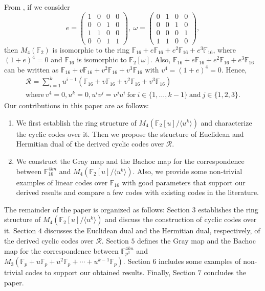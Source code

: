 \documentclass{amsart}
\theoremstyle{definition}
\theoremstyle{remark}
\numberwithin{equation}{section}
\begin{document}
    From \cite{F}, if we consider
    $$e=\begin{pmatrix}
    1&0&0&0\\
    0&0&1&0\\
    1&1&0&0\\
    0&0&1&1
    \end{pmatrix} , ~ \omega=\begin{pmatrix}
    0&1&0&0\\
    0&0&1&0\\
    0&0&0&1\\
    1&1&0&0
    \end{pmatrix},$$
    then $M_4( \mathbb F_2) $ is isomorphic to the ring $\mathbb F_{16}+e \mathbb F_{16}+e^2  \mathbb F_{16}+e^3 \mathbb F_{16}$, where  $(1 + e)^ 4 = 0$ and $\mathbb F_ {16}$ is isomorphic to $\mathbb F _2 [\omega]$. Also,
    $\mathbb F_{16}+e \mathbb F_{16}+e^2  \mathbb F_{16}+e^3 \mathbb F_{16}$ can be written as $\mathbb F_{16}+v \mathbb F_{16}+v^2  \mathbb F_{16}+v^3 \mathbb F_{16}$ with $v^ 4 = (1 + e)^ 4 = 0$. Hence,
    \begin{gather} \label{eq1}
    \mathcal{R} = \sum_{i=1}^{k}u^{i-1}( \mathbb F_{16}+ v\mathbb F_{16} + v^2\mathbb F_{16} + v^3\mathbb F_{16}) \nonumber \\   \text{where}~ v^4=0, u^k=0, u^iv^j=v^ju^i~ \text{for}~ i \in \{1,\dots, k-1\} ~\text{and}~ j \in \{1, 2, 3\}.
    \end{gather}
    Our contributions in this paper are as follows: 
    \begin{enumerate}
\item  We first establish the ring structure of $M_4 (\mathbb F_2 [u]/ \langle u^k \rangle)$ and characterize the cyclic codes over it. Then  we propose the structure of Euclidean and Hermitian dual of the derived cyclic codes over $\mathcal{R}$.
\item  We construct the Gray map and the Bachoc map for the correspondence between  $\mathbb F_{16}^{4kn}$ and $M_4 (\mathbb F_2 [u]/ \langle u^k \rangle)$. Also, we provide some non-trivial examples of linear codes over $\mathbb F_{16}$ with good parameters that support our derived results and compare a few codes with existing codes in the literature.
\end{enumerate}
{The remainder of the  paper is organized as follows: Section $3$ establishes the ring structure of $M_4 (\mathbb F_2 [u]/ \langle u^k \rangle)$ and discuss the construction of cyclic codes over it. Section $4$ discusses the Euclidean dual and the Hermitian dual, respectively, of the derived cyclic codes over $\mathcal{R}$. Section $5$ defines the Gray map and the Bachoc map for the correspondence between  $\mathbb F_{p^3}^{4kn}$ and $ M_3 (\mathbb F_p+u\mathbb F_p+u^2\mathbb F_p+\cdots+u^{k-1}\mathbb F_p ).$ Section $6$ includes some examples of non-trivial codes to support our obtained results. Finally, Section $7$ concludes the paper.}
\end{document}
